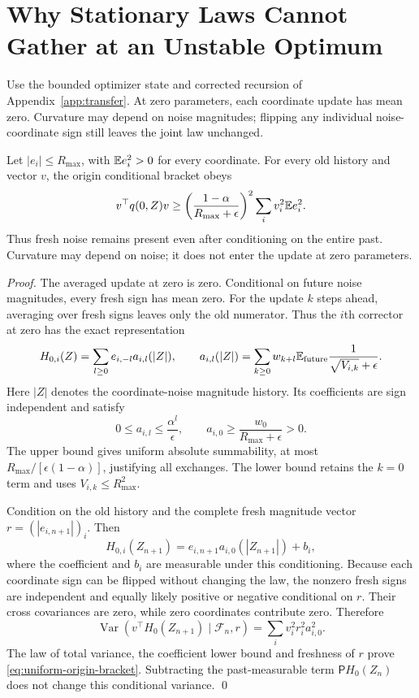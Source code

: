 \section{Why Stationary Laws Cannot Gather at an Unstable Optimum}\label{app:repulsion}

Use the bounded optimizer state and corrected recursion of
Appendix~\ref{app:transfer}. At zero parameters, each coordinate update
has mean zero. Curvature may depend on noise magnitudes; flipping any
individual noise-coordinate sign still leaves the joint law unchanged.

\begin{lemma}
\label{lem:uniform-origin-excitation}
Let $|e_i|\leq R_{\max}$, with $\mathbb E e_i^2>0$ for every coordinate.
For every old history and vector $v$, the origin conditional bracket obeys
\begin{equation}\label{eq:uniform-origin-bracket}
 v^\top q(0,Z)v\geq
 \left(\frac{1-\alpha}{R_{\max}+\epsilon}\right)^2
       \sum_i v_i^2\mathbb E e_i^2.
\end{equation}
Thus fresh noise remains present even after conditioning on the entire
past. Curvature may depend on noise; it does not enter the update at
zero parameters.
\end{lemma}
\begin{proof}
The averaged update at zero is zero. Conditional on future noise
magnitudes, every fresh sign has mean zero. For the update $k$ steps
ahead, averaging over fresh signs leaves only the old numerator. Thus
the $i$th corrector at zero has the exact representation
\[
 H_{0,i}(Z)=\sum_{l\geq0}e_{i,-l}a_{i,l}(|Z|),\qquad
 a_{i,l}(|Z|)=\sum_{k\geq0}w_{k+l}
       \mathbb E_{\rm future}\frac1{\sqrt{V_{i,k}}+\epsilon}.
\]
Here $|Z|$ denotes the coordinate-noise magnitude history. Its coefficients
are sign independent and satisfy
\[
 0\leq a_{i,l}\leq\frac{\alpha^l}{\epsilon},\qquad
 a_{i,0}\geq\frac{w_0}{R_{\max}+\epsilon}>0.
\]
The upper bound gives uniform absolute summability, at most
$R_{\max}/[\epsilon(1-\alpha)]$, justifying all exchanges. The lower
bound retains the $k=0$ term and uses $V_{i,k}\leq R_{\max}^2$.

Condition on the old history and the complete fresh magnitude vector
$r=(|e_{i,n+1}|)_i$. Then
\[
 H_{0,i}(Z_{n+1})=e_{i,n+1}a_{i,0}(|Z_{n+1}|)+b_i,
\]
where the coefficient and $b_i$ are measurable under this conditioning.
Because each coordinate sign can be flipped without changing the law,
the nonzero fresh signs are independent and equally likely positive or
negative conditional on $r$. Their cross covariances are zero, while
zero coordinates contribute zero. Therefore
\[
 \operatorname{Var}\!\left(v^\top H_0(Z_{n+1})\mid\mathcal F_n,r\right)
   =\sum_i v_i^2r_i^2a_{i,0}^2.
\]
The law of total variance, the coefficient lower bound and freshness of
$r$ prove \eqref{eq:uniform-origin-bracket}. Subtracting the past-measurable term
$\mathsf P H_0(Z_n)$ does not change this conditional variance.
\qed\end{proof}

